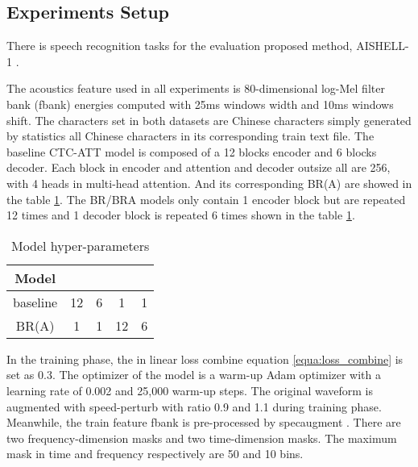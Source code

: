 \documentclass{INTERSPEECH2023}
\begin{document}
\subsection{Experiments Setup}
There is speech recognition tasks for the evaluation proposed method, AISHELL-1 \cite{bu2017aishell}. 


The acoustics feature used in all experiments is 80-dimensional log-Mel filter bank (fbank) energies computed with 25ms windows width and 10ms windows shift. The characters set  in both datasets are Chinese characters simply generated by statistics all Chinese characters in its corresponding train text file. The baseline CTC-ATT model is composed of a 12 blocks encoder and 6 blocks decoder. Each block in encoder and attention and decoder outsize all are 256, with 4 heads in multi-head attention. And its corresponding BR(A) are showed in the table \ref{table:Model_hyper_parameters}. The BR/BRA models only contain 1 encoder block but are repeated 12 times and 1 decoder block is repeated 6 times shown in the table \ref{table:Model_hyper_parameters}.\\
\begin{table}[t!]
    \centering
    \caption{Model hyper-parameters}
    \begin{tabular}{|c|c|c|c|c|} \hline
         \textbf{Model} & \textbf{} & \textbf{} & \textbf{} & \textbf{} \\ \hline
         baseline & 12 & 6 & 1 & 1 \\ \hline
         BR(A) & 1 & 1 & 12 & 6 \\ \hline 
    \end{tabular}
    \label{table:Model_hyper_parameters}
\end{table}
In the training phase, the  in linear loss combine equation \ref{equa:loss_combine} is set as 0.3. The optimizer of the model is a warm-up Adam optimizer with a learning rate of 0.002 and 25,000 warm-up steps. The original waveform is augmented with speed-perturb with ratio 0.9 and 1.1 during training phase. Meanwhile, the train feature fbank is pre-processed by specaugment \cite{park2019specaugment, park2020specaugment}. There are two frequency-dimension masks and two time-dimension masks. The maximum mask in time and frequency respectively are 50 and 10 bins. 
\end{document}
